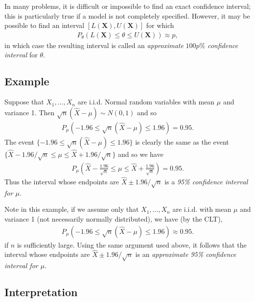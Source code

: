 In many problems, 
it is difficult or impossible to find an exact confidence interval; 
this is particularly true if a model is not completely specified. 
However, it may be possible to find an interval \(\left[L(\boldsymbol{X}), U(\boldsymbol{X})\right]\)
for which 
\begin{align}
P_{\theta} \left(L(\boldsymbol{X}) \leq \theta \leq U(\boldsymbol{X})\right) \approx p,
\end{align}
in which case the resulting interval is called an \emph{approximate} \(100p\%\)
\emph{confidence interval} for \(\theta\).

\subsection{Example}

Suppose that \(X_{1}, \ldots, X_{n}\) are i.i.d. Normal
random variables with mean \(\mu\) and variance 1. 
Then \(\sqrt{n}(\widehat{X} - \mu) \sim N(0,1)\) and so
\begin{align}\label{eq:standard}
P_{\mu}\left(-1.96 \leq \sqrt{n}(\widehat{X} - \mu) \leq 1.96 \right) = 0.95.
\end{align}
The event \(\{-1.96 \leq \sqrt{n}(\widehat{X} - \mu) \leq 1.96 \}\) is clearly 
the same as the event \(\{\widehat{X} - 1.96 / \sqrt{n} \leq \mu \leq \widehat{X} + 1.96 / \sqrt{n} \}\)
and so we have
\begin{align}
P_{\mu}\left(\widehat{X} - \frac{1.96}{\sqrt{n}} \leq \mu \leq \widehat{X} + \frac{1.96}{\sqrt{n}} \right) = 0.95.
\end{align}
Thus the interval whose endpoints are \(\widehat{X} \pm 1.96/\sqrt{n}\)
is a \emph{95\% confidence interval for \(\mu\)}.

Note in this example, 
if we assume only that \(X_{1}, \ldots, X_{n}\) are i.i.d.
with mean \(\mu\) and variance 1 (not necessarily normally distributed),
we have (by the CLT),
\begin{align}
P_{\mu}\left(-1.96 \leq \sqrt{n}(\widehat{X} - \mu) \leq 1.96 \right) \approx 0.95.
\end{align}
if \(n\) is sufficiently large. 
Using the same argument used above, 
it follows that the interval whose endpoints are \(\widehat{X} \pm 1.96/\sqrt{n}\) 
is an \emph{approximate 95\% confidence interval for \(\mu\)}.

\subsection{Interpretation}

